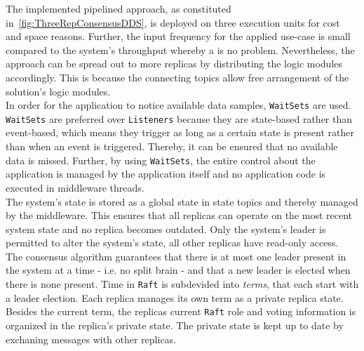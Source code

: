 The implemented pipelined approach, as constituted in~\autoref{fig:ThreeRepConsensusDDS}, is deployed on three execution units for cost and space reasons.
Further, the input frequency for the applied use-case is small compared to the system's throughput whereby a \ChallengeThrough is no problem.
Nevertheless, the approach can be spread out to more replicas by distributing the logic modules accordingly.
This is because the connecting  topics allow free arrangement of the solution's logic modules.
\\

In order for the application to notice available data samples, \texttt{WaitSets} are used.
\texttt{WaitSets} are preferred over \texttt{Listeners} because they are state-based rather than event-based, which means they trigger as long as a certain state is present rather than when an event is triggered.
Thereby, it can be ensured that no available data is missed.
Further, by using \texttt{WaitSets}, the entire control about the application is managed by the application itself and no application code is executed in middleware threads.
\\

The system's state is stored as a global state in  state topics and thereby managed by the middleware.
This ensures that all replicas can operate on the most recent system state and no replica becomes outdated.
Only the system's leader is permitted to alter the system's state, all other replicas have read-only access.
\\

The consensus algorithm guarantees that there is at most one leader present in the system at a time - i.e. no split brain - and that a new leader is elected when there is none present.
Time in \texttt{Raft} is subdevided into \textit{terms}, that each start with a leader election.
Each replica manages its own term as a private replica state.
Besides the current term, the replicas current \texttt{Raft} role and voting information is organized in the replica's private state.
The private state is kept up to date by exchaning messages with other replicas.

